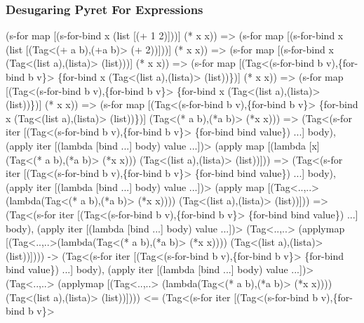 \subsubsection{Desugaring Pyret For Expressions}
\begin{Codes}
   (s-for map
     [(s-for-bind x (list [(+ 1 2)]))]
     (* x x))
=> (s-for map [(s-for-bind x (list
     [(Tag<(+ a b),(+\C a b)> (+ 2))]))] (* x x))
=> (s-for map [(s-for-bind x (Tag<(list a),(list\C a)> (list\C
     [(Tag<(+ a b),(+\C a b)> (+\C 1 2))])))] (* x x))
=> (s-for map
     [(Tag<(s-for-bind b v),\{for-bind b v\}> \{for-bind x
       (Tag<(list a),(list\C a)> (list\C
         [(Tag<(+ a b),(+\C a b)> (+\C 1 2))]))\})] (* x x))
=> (s-for map
     [(Tag<(s-for-bind b v),\{for-bind b v\}> \{for-bind x
       (Tag<(list a),(list\C a)> (list\C
         [(Tag<(+ a b),(+\C a b)> (+\C 1 2))]))\})] (* x x))
=> (s-for map
     [(Tag<(s-for-bind b v),\{for-bind b v\}> \{for-bind x
       (Tag<(list a),(list\C a)> (list\C
         [(Tag<(+ a b),(+\C a b)> (+\C 1 2))]))\})]
     (Tag<(* a b),(*\C a b)>
       (*\C x x)))
=> (Tag<(s-for iter
         [(Tag<(s-for-bind b v),\{for-bind b v\}>
             \{for-bind bind value\}) ...]
           body),
         (apply iter [(lambda [bind ...] body) value ...])>
      (apply map [(lambda [x] (Tag<(* a b),(*\C a b)> (*\C x x)))
        (Tag<(list a),(list\C a)> (list\C
          [(Tag<(+ a b),(+\C a b)> (+\C 1 2))]))]))
=> (Tag<(s-for iter
         [(Tag<(s-for-bind b v),\{for-bind b v\}>
             \{for-bind bind value\}) ...]
           body),
         (apply iter [(lambda [bind ...] body) value ...])>
      (apply map [(Tag<..,..> (lambda\C [x]
          (Tag<(* a b),(*\C a b)> (*\C x x))))
        (Tag<(list a),(list\C a)> (list\C
          [(Tag<(+ a b),(+\C a b)> (+\C 1 2))]))]))
=> (Tag<(s-for iter
         [(Tag<(s-for-bind b v),\{for-bind b v\}>
             \{for-bind bind value\}) ...]
           body),
         (apply iter [(lambda [bind ...] body) value ...])>
      (Tag<..,..> (apply\C map [(Tag<..,..>(lambda\C [x]
          (Tag<(* a b),(*\C a b)> (*\C x x))))
        (Tag<(list a),(list\C a)> (list\C
          [(Tag<(+ a b),(+\C a b)> (+\C 1 2))]))])))
-> (Tag<(s-for iter
         [(Tag<(s-for-bind b v),\{for-bind b v\}>
             \{for-bind bind value\}) ...]
           body),
         (apply iter [(lambda [bind ...] body) value ...])>
      (Tag<..,..> (apply\C map [(Tag<..,..> (lambda\C [x]
           (Tag<(* a b),(*\C a b)> (*\C x x))))
        (Tag<(list a),(list\C a)> (list\C [3]))])))
<= (Tag<(s-for iter
         [(Tag<(s-for-bind b v),\{for-bind b v\}>

\end{Codes}
